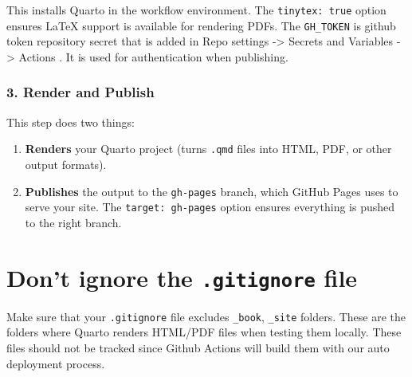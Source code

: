 \documentclass[
  letterpaper,
  DIV=11,
  numbers=noendperiod]{scrreprt}
\newenvironment{Shaded}{\begin{snugshade}}{\end{snugshade}}
\newcommand{\AttributeTok}[1]{\textcolor[rgb]{0.40,0.45,0.13}{#1}}
\newcommand{\FunctionTok}[1]{\textcolor[rgb]{0.28,0.35,0.67}{#1}}
\newcommand{\KeywordTok}[1]{\textcolor[rgb]{0.00,0.23,0.31}{\textbf{#1}}}
\begin{document}
This installs Quarto in the workflow environment. The
\texttt{tinytex:\ true} option ensures LaTeX support is available for
rendering PDFs. The \texttt{GH\_TOKEN} is github token repository secret
that is added in Repo settings -\textgreater{} Secrets and Variables
-\textgreater{} Actions . It is used for authentication when publishing.

\subsubsection{3. Render and Publish}\label{render-and-publish}

\begin{Shaded}
\end{Shaded}

This step does two things:

\begin{enumerate}
\def\labelenumi{\arabic{enumi}.}
\item
  \textbf{Renders} your Quarto project (turns \texttt{.qmd} files into
  HTML, PDF, or other output formats).
\item
  \textbf{Publishes} the output to the \texttt{gh-pages} branch, which
  GitHub Pages uses to serve your site. The \texttt{target:\ gh-pages}
  option ensures everything is pushed to the right branch.
\end{enumerate}

\section{\texorpdfstring{Don't ignore the \texttt{.gitignore}
file}{Don't ignore the .gitignore file}}\label{dont-ignore-the-.gitignore-file}

Make sure that your \texttt{.gitignore} file excludes \texttt{\_book},
\texttt{\_site} folders. These are the folders where Quarto renders
HTML/PDF files when testing them locally. These files should not be
tracked since Github Actions will build them with our auto deployment
process.
\end{document}
